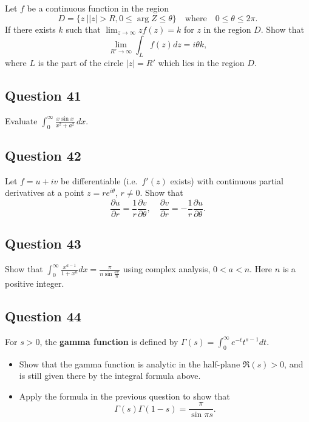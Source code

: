 \documentclass[12pt]{article}
\begin{document}
Let \(f\) be a continuous function in the region
\[D=\{z\ |  |z|>R, 0\leq \arg Z\leq \theta\}\quad\text{where}\quad
0\leq \theta \leq 2\pi.\] If there exists \(k\) such that
\(\displaystyle{\lim_{z\to\infty} zf(z)=k}\) for \(z\) in the region
\(D\). Show that \[\lim_{R'\to\infty} \int_{L} f(z) dz=i\theta k,\]
where \(L\) is the part of the circle \(|z|=R'\) which lies in the
region \(D\).

\hypertarget{question-41-2}{%
\subsection{Question 41}\label{question-41-2}}

Evaluate
\(\displaystyle{ \int_{0}^{\infty}\frac{x\sin x}{x^2+a^2} \, dx }\).

\hypertarget{question-42-2}{%
\subsection{Question 42}\label{question-42-2}}

Let \(f=u+iv\) be differentiable (i.e.~\(f'(z)\) exists) with continuous
partial derivatives at a point \(z=re^{i\theta}\), \(r\not= 0\). Show
that
\[\frac{\partial u}{\partial r}=\frac{1}{r}\frac{\partial v}{\partial \theta},\quad
\frac{\partial v}{\partial r}=-\frac{1}{r}\frac{\partial u}{\partial \theta}.\]

\hypertarget{question-43-2}{%
\subsection{Question 43}\label{question-43-2}}

Show that
\(\displaystyle \int_0^\infty \frac{x^{a-1}}{1+x^n} dx=\frac{\pi}{n\sin \frac{a\pi}{n}}\)
using complex analysis, \(0< a < n\). Here \(n\) is a positive integer.

\hypertarget{question-44-2}{%
\subsection{Question 44}\label{question-44-2}}

For \(s>0\), the \textbf{gamma function} is defined by
\(\displaystyle{\Gamma(s)=\int_0^{\infty} e^{-t}t^{s-1} dt}\).

\begin{itemize}
\item
  Show that the gamma function is analytic in the half-plane
  \(\Re (s)>0\), and is still given there by the integral formula above.
\item
  Apply the formula in the previous question to show that
  \[\Gamma(s)\Gamma(1-s)=\frac{\pi}{\sin \pi s}.\]
\end{itemize}
\end{document}
